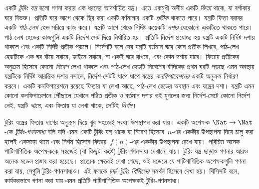 একটি \emph{টুরিং যন্ত্র} হলো গণনা করার এক ধরনের আদর্শায়িত যন্ত্র।
এতে একমুখী অসীম একটি \emph{ফিতা} থাকে, যা বর্গাকার ঘরে বিভক্ত।
প্রতিটি ঘরে আগে থেকে স্থির করা একটি বর্ণমালার একটি \emph{প্রতীক}
থাকতে পারে। যন্ত্রটি ফিতা বরাবর একটি \emph{পাঠ-লেখ হেড}
সরিয়ে কাজ করে। যন্ত্রটি আগে থেকে নির্দিষ্ট কয়েকটি \emph{দশার}
যেকোনো একটিতে থাকতে পারে। পাঠ-লেখ হেডের কাজগুলি একটি নির্দেশ-সেট
দিয়ে নির্ধারিত হয়। প্রতিটি নির্দেশ প্রযোজ্য হয় যন্ত্রটি একটি
নির্দিষ্ট দশায় থাকলে এবং একটি নির্দিষ্ট প্রতীক পড়লে। নির্দেশটি বলে
দেয় যন্ত্রটি বর্তমান ঘরে কোন প্রতীক লিখবে, পাঠ-লেখ হেডটিকে এক ঘর
বাঁয়ে সরাবে, ডাইনে সরাবে, না একই ঘরে রাখবে, এবং কোন দশায়
যাবে। ফিতায় প্রতীকের অনুক্রম হিসেবে কোনো \emph{নিবেশ} লেখা থাকলে
এবং পাঠ-লেখ হেডটি নিবেশের বাঁদিকের প্রথম ঘরটি পড়ছে এমন অবস্থায়
যন্ত্রটিকে নির্দিষ্ট আরম্ভিক দশায় বসালে, নির্দেশ-সেটটি ধাপে ধাপে
যন্ত্রের \emph{কনফিগারেশনের} একটি অনুক্রম নির্ধারণ করবে। একটি
কনফিগারেশনে রয়েছে ফিতায় যা লেখা আছে, পাঠ-লেখ হেডের অবস্থান এবং
যন্ত্রের দশা। যন্ত্রটি এমন কোনো কনফিগারেশনে পৌঁছালে যেখানে পঠিত
প্রতীক ও বর্তমান দশার ওই যুগলের জন্য নির্দেশ-সেটে কোনো নির্দেশ
নেই, যন্ত্রটি \emph{থামে}, এবং ফিতায় যা লেখা থাকে, সেটিই
\emph{নির্গম}।

টুরিং যন্ত্রের ফিতায় দাগের অনুক্রম দিয়ে খুব সহজেই সংখ্যা
উপস্থাপন করা যায়। একটি অপেক্ষক $\Nat \to \Nat$-কে
\emph{টুরিং-গণনসাধ্য} বলি যদি এমন একটি টুরিং যন্ত্র থাকে যা
নিবেশ হিসেবে~$n$-এর এককীয় উপস্থাপনা দিয়ে চালু করা হলেই
একসময় থামে এবং নির্গম হিসেবে ফিতায়~$f(n)$-এর এককীয়
উপস্থাপনা রেখে যায়। পরিচিত অনেক পাটিগাণিতিক অপেক্ষককে সহজেই
(বা কিছুটা কষ্টে) টুরিং-গণনসাধ্য দেখানো যায়। টুরিং যন্ত্র
ছাড়াও গণনার আরও অনেক মডেল প্রস্তাব করা হয়েছে। প্রত্যেক
ক্ষেত্রেই দেখা গেছে, ওই মডেলে যে পাটিগাণিতিক অপেক্ষকগুলি গণনা করা
যায়, সেগুলি টুরিং-গণনসাধ্যও। এই ফলকে \emph{চার্চ--টুরিং
থিসিসের} সমর্থন হিসেবে দেখা হয়। থিসিসটি বলে, কার্যকরভাবে গণনা
করা যায় এমন প্রতিটি পাটিগাণিতিক অপেক্ষকই টুরিং-গণনসাধ্য।
